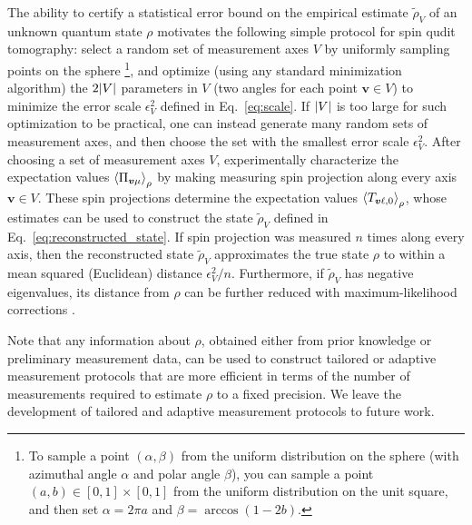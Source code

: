 \documentclass[notitlepage,twocolumn]{revtex4-2}
\newcommand{\p}[1]{\left(#1\right)} %
\newcommand{\bk}{\Braket} %
\renewcommand{\v}{\bm} %
\begin{document}
The ability to certify a statistical error bound on the empirical estimate $\tilde\rho_V$ of an unknown quantum state $\rho$ motivates the following simple protocol for spin qudit tomography: select a random set of measurement axes $V$ by uniformly sampling points on the sphere \footnote{To sample a point $\p{\alpha,\beta}$ from the uniform distribution on the sphere (with azimuthal angle $\alpha$ and polar angle $\beta$), you can sample a point $\p{a,b}\in[0,1]\times[0,1]$ from the uniform distribution on the unit square, and then set $\alpha=2\pi a$ and $\beta=\arccos\p{1-2b}$.}, and optimize (using any standard minimization algorithm) the $2\abs{V}$ parameters in $V$ (two angles for each point $\v v\in V$) to minimize the error scale $\epsilon_V^2$ defined in Eq.~\eqref{eq:scale}.
If $\abs{V}$ is too large for such optimization  to be practical, one can instead generate many random sets of measurement axes, and then choose the set with the smallest error scale $\epsilon_V^2$.
After choosing a set of measurement axes $V$, experimentally characterize the expectation values $\bk{\Pi_{\v v\mu}}_\rho$ by making measuring spin projection along every axis $\v v\in V$.
These spin projections determine the expectation values $\bk{T_{\v v\ell,0}}_\rho$, whose estimates can be used to construct the state $\tilde\rho_V$ defined in Eq.~\eqref{eq:reconstructed_state}.
If spin projection was measured $n$ times along every axis, then the reconstructed state $\tilde\rho_V$ approximates the true state $\rho$ to within a mean squared (Euclidean) distance $\epsilon_V^2/n$.
Furthermore, if $\tilde\rho_V$ has negative eigenvalues, its distance from $\rho$ can be further reduced with maximum-likelihood corrections \cite{smolin2012efficient}.

Note that any information about $\rho$, obtained either from prior knowledge or preliminary measurement data, can be used to construct tailored or adaptive measurement protocols \cite{pereira2018adaptive} that are more efficient in terms of the number of measurements required to estimate $\rho$ to a fixed precision.
We leave the development of tailored and adaptive measurement protocols to future work.
\end{document}
